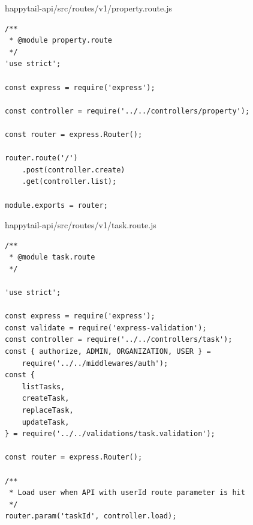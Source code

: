 \documentclass[12pt]{article}
\begin{document}
  \normalsize
 happytail-api/src/routes/v1/property.route.js
 \footnotesize
\begin{verbatim}
/**
 * @module property.route
 */
'use strict';

const express = require('express');

const controller = require('../../controllers/property');

const router = express.Router();

router.route('/')
    .post(controller.create)
    .get(controller.list);

module.exports = router;
 \end{verbatim}
  \normalsize
 happytail-api/src/routes/v1/task.route.js
 \footnotesize
\begin{verbatim}
/**
 * @module task.route
 */

'use strict';

const express = require('express');
const validate = require('express-validation');
const controller = require('../../controllers/task');
const { authorize, ADMIN, ORGANIZATION, USER } = 
	require('../../middlewares/auth');
const {
    listTasks,
    createTask,
    replaceTask,
    updateTask,
} = require('../../validations/task.validation');

const router = express.Router();

/**
 * Load user when API with userId route parameter is hit
 */
router.param('taskId', controller.load);


\end{verbatim}
\end{document}
